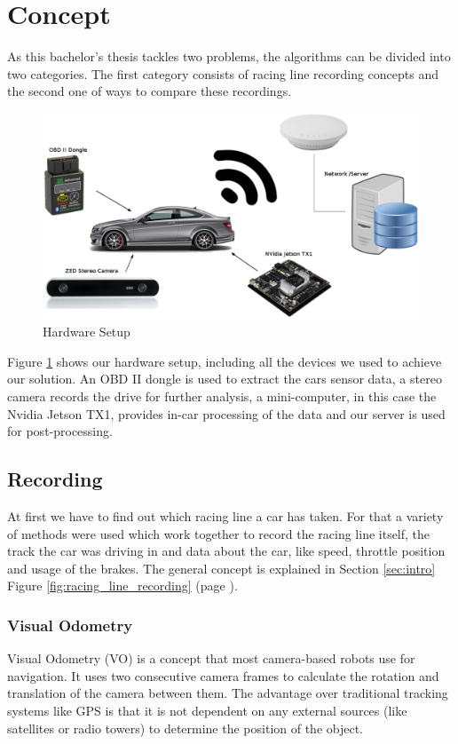 \section{Concept}
\label{sec:algorithm}
\graphicspath{{utils/}}
As this bachelor's thesis tackles two problems, the algorithms can be divided into two categories.
The first category consists of racing line recording concepts and the second one of ways to compare these recordings.

\begin{figure}[!ht]
\centering
\includegraphics[width=\textwidth]{hw_setup}
\caption{Hardware Setup}
\label{fig:hw_setup}
\end{figure}

Figure \ref{fig:hw_setup} shows our hardware setup, including all the devices we used to achieve our solution. An OBD II dongle is used to extract the cars sensor data, a stereo camera records the drive for further analysis, a mini-computer, in this case the Nvidia Jetson TX1, provides in-car processing of the data and our server is used for post-processing.
\clearpage
\subsection{Recording}
At first we have to find out which racing line a car has taken. For that a variety of methods were used which work together to record the racing line itself, the track the car was driving in and data about the car, like speed, throttle position and usage of the brakes. The general concept is explained in Section \ref{sec:intro} Figure \ref{fig:racing_line_recording} (page \pageref{fig:racing_line_recording}).

\subsubsection{Visual Odometry}
\label{subsec:vo}
Visual Odometry (VO) is a concept that most camera-based robots use for navigation. It uses two consecutive camera frames to calculate the rotation and translation of the camera between them. The advantage over traditional tracking systems like GPS is that it is not dependent on any external sources (like satellites or radio towers) to determine the position of the object.

